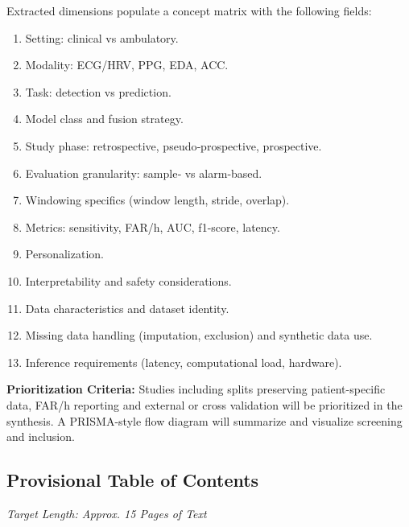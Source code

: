 Extracted dimensions populate a concept matrix with the following
fields:
\begin{enumerate}
  \item Setting: clinical vs ambulatory.
  \item Modality: ECG/HRV, PPG, EDA, ACC.
  \item Task: detection vs prediction.
  \item Model class and fusion strategy.
  \item Study phase: retrospective, pseudo‑prospective, prospective.
  \item Evaluation granularity: sample‑ vs alarm‑based.
  \item Windowing specifics (window length, stride, overlap).
  \item Metrics: sensitivity, FAR/h, AUC, f1-score, latency.
  \item Personalization.
  \item Interpretability and safety considerations.
  \item Data characteristics and dataset identity.
  \item Missing data handling (imputation, exclusion) and synthetic data use.
  \item Inference requirements (latency, computational load, hardware).
\end{enumerate}

\noindent\textbf{Prioritization Criteria:} 
Studies including splits preserving patient-specific data, FAR/h reporting 
and external or cross validation will be prioritized in the synthesis. A PRISMA-style flow diagram
will summarize and visualize screening and inclusion.

\subsection{Provisional Table of Contents}
\textit{Target Length: Approx. 15 Pages of Text}

